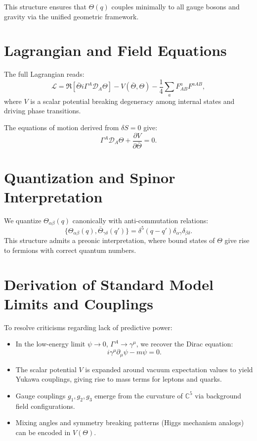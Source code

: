 \documentclass[12pt]{article}
\begin{document}
This structure ensures that \( \Theta(q) \) couples minimally to all gauge bosons and gravity via the unified geometric framework.

\section{Lagrangian and Field Equations}
The full Lagrangian reads:
\[
\mathcal{L} = \Re \left[ \bar{\Theta} i \Gamma^A \mathcal{D}_A \Theta \right] - V(\bar{\Theta}, \Theta) - \frac{1}{4} \sum_a F^a_{AB} F^{aAB},
\]
where \( V \) is a scalar potential breaking degeneracy among internal states and driving phase transitions.

The equations of motion derived from \( \delta S = 0 \) give:
\[
\Gamma^A \mathcal{D}_A \Theta + \frac{\partial V}{\partial \bar{\Theta}} = 0.
\]

\section{Quantization and Spinor Interpretation}
We quantize \( \Theta_{\alpha\beta}(q) \) canonically with anti-commutation relations:
\[ \{ \Theta_{\alpha\beta}(q), \bar{\Theta}_{\gamma\delta}(q') \} = \delta^5(q-q') \delta_{\alpha\gamma} \delta_{\beta\delta}. \]
This structure admits a preonic interpretation, where bound states of \( \Theta \) give rise to fermions with correct quantum numbers.

\section{Derivation of Standard Model Limits and Couplings}
To resolve criticisms regarding lack of predictive power:

\begin{itemize}
  \item In the low-energy limit \( \psi \rightarrow 0 \), \( \Gamma^A \rightarrow \gamma^\mu \), we recover the Dirac equation:
  \[ i \gamma^\mu \partial_\mu \psi - m \psi = 0. \]
  \item The scalar potential \( V \) is expanded around vacuum expectation values to yield Yukawa couplings, giving rise to mass terms for leptons and quarks.
  \item Gauge couplings \( g_1, g_2, g_3 \) emerge from the curvature of \( \mathbb{C}^5 \) via background field configurations.
  \item Mixing angles and symmetry breaking patterns (Higgs mechanism analogs) can be encoded in \( V(\Theta) \).
\end{itemize}
\end{document}
